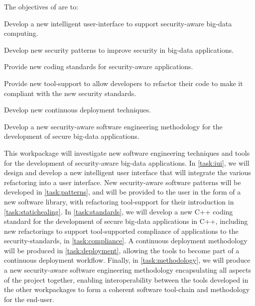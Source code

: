 \addtocounter{wpno}{1}
\begin{Workpackage}{\thewpno}
\WPTitle{\wpname{\thewpno}}



\begin{WPObjectives}
The objectives of \theWP{} are to:
\begin{compactitem}
\item Develop a new intelligent user-interface to support security-aware big-data computing.
\item Develop new security patterns to improve security in big-data applications.
\item Provide new coding standards for security-aware applications.
\item Provide new tool-support to allow developers to refactor their code to make it compliant with the new security standards.
\item Develop new continuous deployment techniques.
\item Develop a new security-aware software engineering methodology for the development of secure big-data applications.

\end{compactitem}
\end{WPObjectives}

\begin{WPDescription}
This workpackage will investigate new software engineering techniques and tools for the development of security-aware big-data applications. In \ref{task:iui}, we will design and develop a new intelligent user interface that will integrate the various refactoring into a user interface. New security-aware software patterns will be developed in \ref{task:patterns}, and will be provided to the user in the form of a new software library, with refactoring tool-support for their introduction in \ref{task:statichealing}.  In \ref{task:standards}, we will develop a new C++ coding standard for the development of secure big-data applications in C++, including new refactorings to support tool-supported compliance of applications to the security-standards, in \ref{task:compliance}. A continuous deployment methodology will be produced in \ref{task:deployment}, allowing the \TheProject{} tools to become part of a continuous deployment workflow.
Finally, in \ref{task:methodology}, we will produce a new security-aware software engineering methodology encapsulating all aspects of the \TheProject{} project together, enabling interoperability between the tools developed in the other workpackages to form a coherent software tool-chain and methodology for the end-user. 



\end{WPDescription}
\end{Workpackage}
